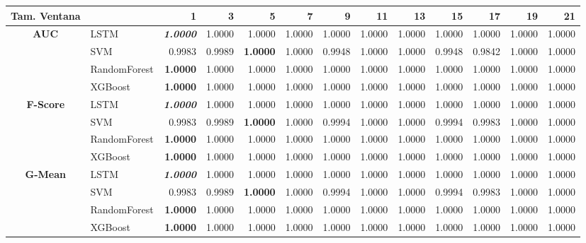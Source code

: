 \begin{table}[H]
	\centering
	\begin{adjustbox}{max width=13cm}
		\begin{tabular}{|c|l|r|r|r|r|r|r|r|r|r|r|r|}
			\hline
			\textbf{Tam. Ventana}&         &      1  &      3  &   5  &   7  &      9  &   11 &   13 &      15 &      17 &   19 &   21 \\
			\hline
			\textbf{AUC} &  LSTM & \textit{ \textbf{  1.0000 } } &  1.0000 &  1.0000 &  1.0000 &  1.0000 &  1.0000 &  1.0000 &  1.0000 &  1.0000 &  1.0000 &  1.0000 \\
			&  SVM &  0.9983 &  0.9989 & \textbf{  1.0000 } &  1.0000 &  0.9948 &  1.0000 &  1.0000 &  0.9948 &  0.9842 &  1.0000 &  1.0000 \\
			&  RandomForest & \textbf{  1.0000 } &  1.0000 &  1.0000 &  1.0000 &  1.0000 &  1.0000 &  1.0000 &  1.0000 &  1.0000 &  1.0000 &  1.0000 \\
			&  XGBoost & \textbf{  1.0000 } &  1.0000 &  1.0000 &  1.0000 &  1.0000 &  1.0000 &  1.0000 &  1.0000 &  1.0000 &  1.0000 &  1.0000 \\
			\hline
			\textbf{F-Score} &  LSTM & \textit{ \textbf{  1.0000 } } &  1.0000 &  1.0000 &  1.0000 &  1.0000 &  1.0000 &  1.0000 &  1.0000 &  1.0000 &  1.0000 &  1.0000 \\
			&  SVM &  0.9983 &  0.9989 & \textbf{  1.0000 } &  1.0000 &  0.9994 &  1.0000 &  1.0000 &  0.9994 &  0.9983 &  1.0000 &  1.0000 \\
			&  RandomForest & \textbf{  1.0000 } &  1.0000 &  1.0000 &  1.0000 &  1.0000 &  1.0000 &  1.0000 &  1.0000 &  1.0000 &  1.0000 &  1.0000 \\
			&  XGBoost & \textbf{  1.0000 } &  1.0000 &  1.0000 &  1.0000 &  1.0000 &  1.0000 &  1.0000 &  1.0000 &  1.0000 &  1.0000 &  1.0000 \\
			\hline
			\textbf{G-Mean} &  LSTM & \textit{ \textbf{  1.0000 } } &  1.0000 &  1.0000 &  1.0000 &  1.0000 &  1.0000 &  1.0000 &  1.0000 &  1.0000 &  1.0000 &  1.0000 \\
			&  SVM &  0.9983 &  0.9989 & \textbf{  1.0000 } &  1.0000 &  0.9994 &  1.0000 &  1.0000 &  0.9994 &  0.9983 &  1.0000 &  1.0000 \\
			&  RandomForest & \textbf{  1.0000 } &  1.0000 &  1.0000 &  1.0000 &  1.0000 &  1.0000 &  1.0000 &  1.0000 &  1.0000 &  1.0000 &  1.0000 \\
			&  XGBoost & \textbf{  1.0000 } &  1.0000 &  1.0000 &  1.0000 &  1.0000 &  1.0000 &  1.0000 &  1.0000 &  1.0000 &  1.0000 &  1.0000 \\

\end{tabular}
\end{adjustbox}
\end{table}
